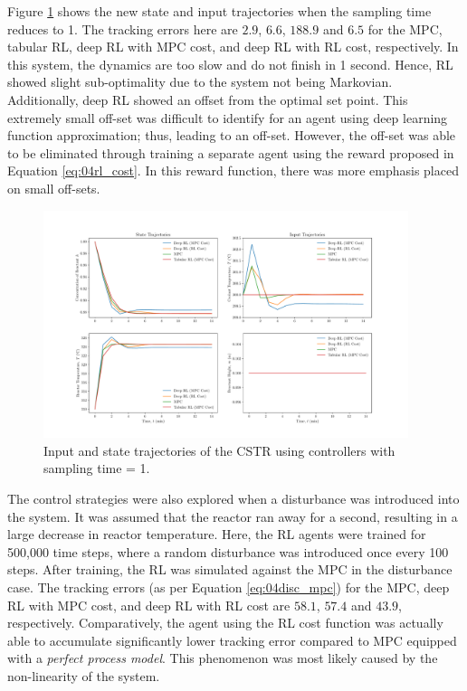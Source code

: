 Figure \ref{fig:04CSTR_1} shows the new state and input trajectories when the sampling time reduces to 1. The tracking errors here are $2.9$, $6.6$, $188.9$ and $6.5$ for the MPC, tabular RL, deep RL with MPC cost, and deep RL with RL cost, respectively. In this system, the dynamics are too slow and do not finish in 1 second.  Hence, RL showed slight sub-optimality due to the system not being Markovian.  Additionally, deep RL showed an offset from the optimal set point.  This extremely small off-set was difficult to identify for an agent using deep learning function approximation; thus, leading to an off-set.  However, the off-set was able to be eliminated through training a separate agent using the reward proposed in Equation \ref{eq:04rl_cost}.  In this reward function, there was more emphasis placed on small off-sets.
\begin{figure}[H]
    \centering
    \includegraphics[width=0.95\textwidth]{images/ch4/States_and_Inputs_1_CSTR.pdf}
    \caption{Input and state trajectories of the CSTR using controllers with sampling time = 1.}
    \label{fig:04CSTR_1}
\end{figure}

The control strategies were also explored when a disturbance was introduced into the system. It was assumed that the reactor ran away for a second, resulting in a large decrease in reactor temperature. Here, the RL agents were trained for 500,000 time steps, where a random disturbance was introduced once every 100 steps.  After training, the RL was simulated against the MPC in the disturbance case. The tracking errors (as per Equation \ref{eq:04disc_mpc}) for the MPC, deep RL with MPC cost, and deep RL with RL cost are $58.1$, $57.4$ and $43.9$, respectively. Comparatively, the agent using the RL cost function was actually able to accumulate significantly lower tracking error compared to MPC equipped with a \textit{perfect process model}. This phenomenon was most likely caused by the non-linearity of the system.  

